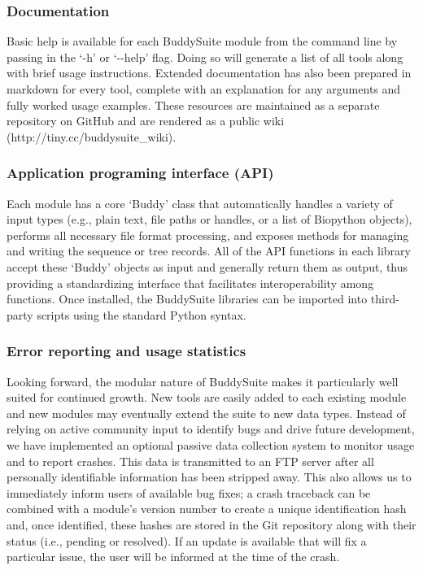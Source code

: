 \documentclass[nogrid]{MBE_article}%
\begin{document}
\subsubsection{Documentation}
Basic help is available for each BuddySuite module from the command line by passing in the `-h' or `-{}-help' flag. Doing so will generate a list of all tools along with brief usage instructions. Extended documentation has also been prepared in markdown for every tool, complete with an explanation for any arguments and fully worked usage examples. These resources are maintained as a separate repository on GitHub and are rendered as a public wiki (http://tiny.cc/buddysuite\_wiki).

\subsubsection{Application programing interface (API)}
Each module has a core `Buddy' class that automatically handles a variety of input types (e.g., plain text, file paths or handles, or a list of Biopython objects), performs all necessary file format processing, and exposes methods for managing and writing the sequence or tree records. All of the API functions in each library accept these `Buddy' objects as input and generally return them as output, thus providing a standardizing interface that facilitates interoperability among functions. Once installed, the BuddySuite libraries can be imported into third-party scripts using the standard Python syntax.

\subsubsection{Error reporting and usage statistics}
Looking forward, the modular nature of BuddySuite makes it particularly well suited for continued growth. New tools are easily added to each existing module and new modules may eventually extend the suite to new data types. Instead of relying on active community input to identify bugs and drive future development, we have implemented an optional passive data collection system to monitor usage and to report crashes. This data is transmitted to an FTP server after all personally identifiable information has been stripped away. This also allows us to immediately inform users of available bug fixes; a crash traceback can be combined with a module's version number to create a unique identification hash and, once identified, these hashes are stored in the Git repository along with their status (i.e., pending or resolved). If an update is available that will fix a particular issue, the user will be informed at the time of the crash.
\end{document}
